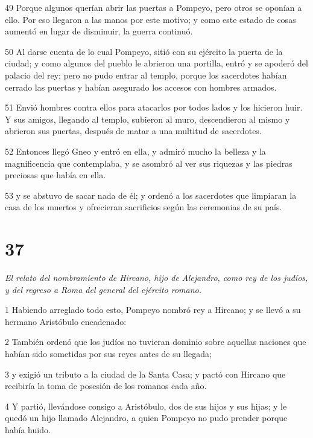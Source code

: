 \par 49 Porque algunos querían abrir las puertas a Pompeyo, pero otros se oponían a ello. Por eso llegaron a las manos por este motivo; y como este estado de cosas aumentó en lugar de disminuir, la guerra continuó.

\par 50 Al darse cuenta de lo cual Pompeyo, sitió con su ejército la puerta de la ciudad; y como algunos del pueblo le abrieron una portilla, entró y se apoderó del palacio del rey; pero no pudo entrar al templo, porque los sacerdotes habían cerrado las puertas y habían asegurado los accesos con hombres armados.

\par 51 Envió hombres contra ellos para atacarlos por todos lados y los hicieron huir. Y sus amigos, llegando al templo, subieron al muro, descendieron al mismo y abrieron sus puertas, después de matar a una multitud de sacerdotes.

\par 52 Entonces llegó Gneo y entró en ella, y admiró mucho la belleza y la magnificencia que contemplaba, y se asombró al ver sus riquezas y las piedras preciosas que había en ella.

\par 53 y se abstuvo de sacar nada de él; y ordenó a los sacerdotes que limpiaran la casa de los muertos y ofrecieran sacrificios según las ceremonias de su país.

\chapter{37}

\par \textit{El relato del nombramiento de Hircano, hijo de Alejandro, como rey de los judíos, y del regreso a Roma del general del ejército romano.}

\par 1 Habiendo arreglado todo esto, Pompeyo nombró rey a Hircano; y se llevó a su hermano Aristóbulo encadenado:

\par 2 También ordenó que los judíos no tuvieran dominio sobre aquellas naciones que habían sido sometidas por sus reyes antes de su llegada;

\par 3 y exigió un tributo a la ciudad de la Santa Casa; y pactó con Hircano que recibiría la toma de posesión de los romanos cada año.

\par 4 Y partió, llevándose consigo a Aristóbulo, dos de sus hijos y sus hijas; y le quedó un hijo llamado Alejandro, a quien Pompeyo no pudo prender porque había huido.

